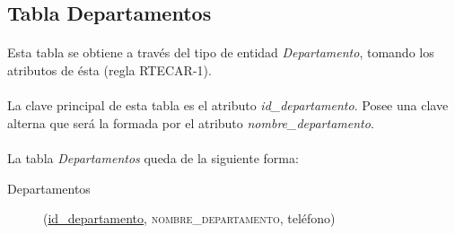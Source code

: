    \subsection{Tabla Departamentos}

      \paragraph{}Esta tabla se obtiene a través del tipo de entidad
      \textit{Departamento}, tomando los atributos de ésta (regla RTECAR-1).

      \paragraph{}La clave principal de esta tabla es el atributo
      \textit{id\_departamento}. Posee una clave alterna que será la formada por
      el atributo \textit{nombre\_departamento}.

      \paragraph{}La tabla \textit{Departamentos} queda de la siguiente forma:

      \begin{description}
         \item[Departamentos] \begin{flushleft}(\underline{id\_departamento},
         \textsc{nombre\_departamento}, teléfono)\end{flushleft}
      \end{description}
